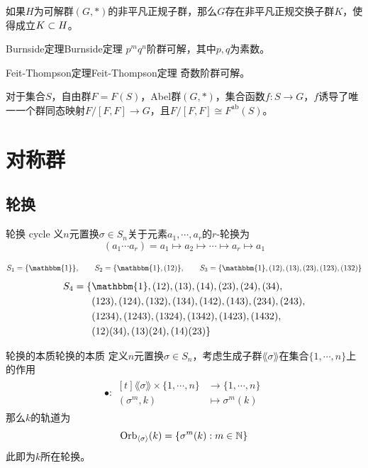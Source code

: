 \begin{corollary}
	如果$H$为可解群$(G,*)$的非平凡正规子群，那么$G$存在非平凡正规交换子群$K$，使得成立$K\subset H$。
\end{corollary}

\begin{theorem}{Burnside定理}{Burnside定理}
	$p^mq^n$阶群可解，其中$p,q$为素数。
\end{theorem}

\begin{theorem}{Feit-Thompson定理}{Feit-Thompson定理}
	奇数阶群可解。
\end{theorem}

\begin{proposition}
	对于集合$S$，自由群$F=F(S)$，Abel群$(G,*)$，集合函数$f:S\to G$，$f$诱导了唯一一个群同态映射$F/[F,F]\to G$，且$F/[F,F]\cong F^{\mathrm{ab}}(S)$。
\end{proposition}

\section{对称群}

\subsection{轮换}

\begin{definition}{轮换 cycle}
	义$n$元置换$\sigma\in S_n$关于元素$a_1,\cdots,a_r$的$r$-轮换为
	$$  
	(a_1\cdots a_r)=a_1\mapsto a_2 \mapsto\cdots\mapsto a_r \mapsto a_1  
	$$
\end{definition}

\begin{problem}
	$$
	S_1=\{\mathbbm{1}\},\qquad S_2=\{\mathbbm{1},(12)\},\qquad S_3=\{ \mathbbm{1},(12),(13),(23),(123),(132) \}
	$$
	\begin{align*}
		S_4=\{ & \mathbbm{1},(12),(13),(14),(23),(24),(34),\\
		& (123),(124),(132),(134),(142),(143),(234),(243),\\
		& (1234),(1243),(1324),(1342),(1423),(1432),\\
		& (12)(34),(13)(24),(14)(23) \}
	\end{align*}
\end{problem}

\begin{theorem}{轮换的本质}{轮换的本质}
	定义$n$元置换$\sigma\in S_n$，考虑生成子群$\lang\sigma\rang$在集合$\{1,\cdots, n\}$上的作用
	\begin{align*}
		\bullet:\begin{aligned}[t]
			\lang \sigma \rang\times \{1,\cdots,n\}&\longrightarrow \{1,\cdots,n\}\\
			(\sigma^m,k)&\longmapsto \sigma^m(k)
		\end{aligned}
	\end{align*}
	那么$k$的轨道为
	$$
	\mathrm{Orb}_{\langle \sigma \rangle}(k)=\{ \sigma^m(k):m\in\mathbb{N} \}
	$$
	此即为$k$所在轮换。
\end{theorem}

